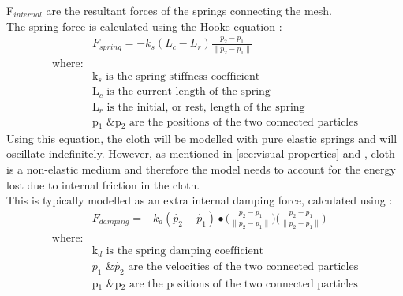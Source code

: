 F$_{internal}$ are the resultant forces of the springs connecting the mesh.
\\The spring force is calculated using the Hooke equation \parencite[201]{Parent2012}:
\begin{equation}
\begin{split}
\label{eq:hooke equation}
  &F_{spring} = -k_{s}(L_{c}-L_{r})\frac{p_{2}-p_{1}}{\parallel p_{2}-p_{1}\parallel}
  \\\text{where:}
  \\&\text{k$_{s}$ is the spring stiffness coefficient}
  \\&\text{L$_{c}$ is the current length of the spring}
  \\&\text{L$_{r}$ is the initial, or rest, length of the spring}
  \\&\text{p$_{1}$ \& p$_{2}$ are the positions of the two connected particles}
\end{split}
\end{equation}
Using this equation, the cloth will be modelled with pure elastic springs and will oscillate indefinitely. However, as mentioned in \ref{sec:visual properties} and \parencite[1]{Provot2001}, cloth is a non-elastic medium and therefore the model needs to account for the energy lost due to internal friction in the cloth.
\\This is typically modelled as an extra internal damping force, calculated using \parencite[201]{Parent2012}:
\begin{equation}
\begin{split}
\label{eq:spring damping}
  &F_{damping} = -k_{d}(\dot{p_{2}}-\dot{p_{1}})\bullet\bigg(\frac{p_{2}-p_{1}}{\parallel p_{2}-p_{1}\parallel}\bigg)\bigg(\frac{p_{2}-p_{1}}{\parallel p_{2}-p_{1}\parallel}\bigg)
  \\\text{where:}
  \\&\text{k$_{d}$ is the spring damping coefficient}
  \\&\text{$\dot{p_{1}}$ \& $\dot{p_{2}}$ are the velocities of the two connected particles}
  \\&\text{p$_{1}$ \& p$_{2}$ are the positions of the two connected particles}
\end{split}
\end{equation}

